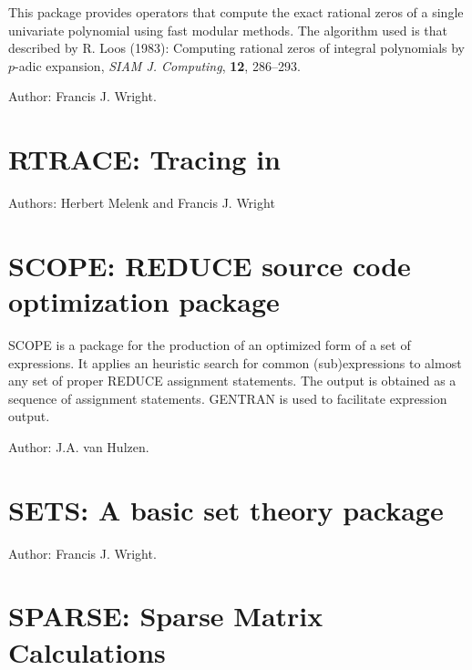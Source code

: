 
This package provides operators that compute the exact rational zeros
of a single univariate polynomial using fast modular methods.  The
algorithm used is that described by R. Loos (1983): Computing rational
zeros of integral polynomials by $p$-adic expansion, \textit{SIAM J.
Computing}, \textbf{12}, 286--293.

Author: Francis J. Wright.


\newpage

\section{RTRACE: Tracing in \REDUCE}

Authors: Herbert Melenk and Francis J. Wright


\newpage

\section{SCOPE: REDUCE source code optimization package} 
\label{SCOPE}

SCOPE is a package for the production of an optimized form of a set of
expressions.  It applies an heuristic search for common (sub)expressions
to almost any set of proper REDUCE assignment statements.  The
output is obtained as a sequence of assignment statements.  GENTRAN is
used to facilitate expression output.

Author:  J.A. van Hulzen.

\newpage

\section{SETS: A basic set theory package} 


Author: Francis J. Wright.


\newpage

\section{SPARSE: Sparse Matrix Calculations}

